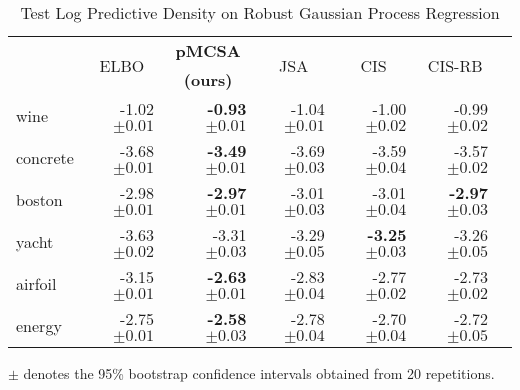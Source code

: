 
\begin{table*}
  \centering
  \caption{Test Log Predictive Density on Robust Gaussian Process Regression}\label{table:gp}
  \setlength{\tabcolsep}{4pt}
  \begin{threeparttable}
  \begin{tabular}{lrrrrrr}
    \toprule
    & \multicolumn{1}{c}{\multirow{2}{*}{ELBO}} & \multicolumn{1}{c}{\multirow{1}{*}{\textbf{pMCSA}}} & \multicolumn{1}{c}{\multirow{2}{*}{JSA}} & \multicolumn{1}{c}{\multirow{2}{*}{CIS}} & \multicolumn{1}{c}{\multirow{2}{*}{CIS-RB}} \\ %
    & & \multicolumn{1}{c}{\textbf{(ours)}} & & & \\
    \midrule
 wine & {-1.02 {\scriptsize{\(\pm 0.01\)}}} & {\bf-0.93 {\scriptsize{\(\pm 0.01\)}}} & {-1.04 {\scriptsize{\(\pm 0.01\)}}} & {-1.00 {\scriptsize{\(\pm 0.02\)}}} & {-0.99 {\scriptsize{\(\pm 0.02\)}}} \\
    concrete & {-3.68 {\scriptsize{\(\pm 0.01\)}}} & {\bf-3.49 {\scriptsize{\(\pm 0.01\)}}} & {-3.69 {\scriptsize{\(\pm 0.03\)}}} & {-3.59 {\scriptsize{\(\pm 0.04\)}}} & {-3.57 {\scriptsize{\(\pm 0.02\)}}} \\
    boston & {-2.98 {\scriptsize{\(\pm 0.01\)}}} & {\bf-2.97 {\scriptsize{\(\pm 0.01\)}}} & {-3.01 {\scriptsize{\(\pm 0.03\)}}} & {-3.01 {\scriptsize{\(\pm 0.04\)}}} & {\bf-2.97 {\scriptsize{\(\pm 0.03\)}}} \\
    yacht & {-3.63 {\scriptsize{\(\pm 0.02\)}}} & {-3.31 {\scriptsize{\(\pm 0.03\)}}} & {-3.29 {\scriptsize{\(\pm 0.05\)}}} & {\bf-3.25 {\scriptsize{\(\pm 0.03\)}}} & {-3.26 {\scriptsize{\(\pm 0.05\)}}} \\
    airfoil & {-3.15 {\scriptsize{\(\pm 0.01\)}}} & {\bf-2.63 {\scriptsize{\(\pm 0.01\)}}} & {-2.83 {\scriptsize{\(\pm 0.04\)}}} & {-2.77 {\scriptsize{\(\pm 0.02\)}}} & {-2.73 {\scriptsize{\(\pm 0.02\)}}} \\
    energy & {-2.75 {\scriptsize{\(\pm 0.01\)}}} & {\bf-2.58 {\scriptsize{\(\pm 0.03\)}}} & {-2.78 {\scriptsize{\(\pm 0.04\)}}} & {-2.70 {\scriptsize{\(\pm 0.04\)}}} & {-2.72 {\scriptsize{\(\pm 0.05\)}}} \\\bottomrule
  \end{tabular}
  \begin{tablenotes}
    \item[]{\footnotesize \(\pm\) denotes the 95\% bootstrap confidence intervals obtained from 20 repetitions.}
  \end{tablenotes}
  \end{threeparttable}
\end{table*}

